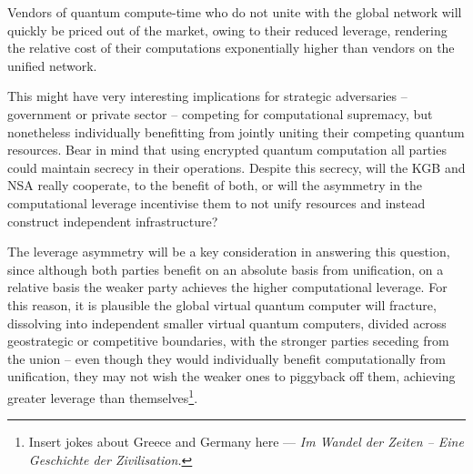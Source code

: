 Vendors of quantum compute-time who do not unite with the global network will quickly be priced out of the market, owing to their reduced leverage, rendering the relative cost of their computations exponentially higher than vendors on the unified network.

This might have very interesting implications for strategic adversaries -- government or private sector -- competing for computational supremacy, but nonetheless individually benefitting from jointly uniting their competing quantum resources. Bear in mind that using encrypted quantum computation all parties could maintain secrecy in their operations. Despite this secrecy, will the KGB and NSA really cooperate, to the benefit of both, or will the asymmetry in the computational leverage incentivise them to not unify resources and instead construct independent infrastructure?

The leverage asymmetry will be a key consideration in answering this question, since although both parties benefit on an absolute basis from unification, on a relative basis the weaker party achieves the higher computational leverage. For this reason, it is plausible the global virtual quantum computer will fracture, dissolving into independent smaller virtual quantum computers, divided across geostrategic or competitive boundaries, with the stronger parties seceding from the union -- even though they would individually benefit computationally from unification, they may not wish the weaker ones to piggyback off them, achieving greater leverage than themselves\footnote{Insert jokes about Greece and Germany here --- \textit{Im Wandel der Zeiten -- Eine Geschichte der Zivilisation.}}.